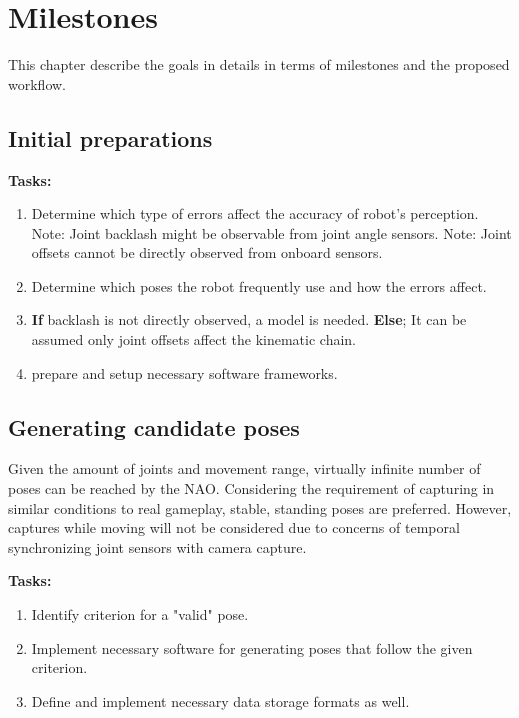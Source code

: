 \documentclass[english, printversion, nomenclature, notitle]{tuvisionthesis} %
\begin{document}
\chapter{Milestones}
\label{chap:milestones}

This chapter describe the goals in details in terms of milestones and the proposed workflow.

\section{Initial preparations}
\textbf{Tasks:}
\begin{enumerate}
	\item Determine which type of errors affect the accuracy of robot's perception.
	\subitem Note: Joint backlash might be observable from joint angle sensors.
	\subitem Note: Joint offsets cannot be directly observed from onboard sensors.
	\item Determine which poses the robot frequently use and how the errors affect.
	\item \textbf{If} backlash is not directly observed, a model is needed.
	\subitem \textbf{Else}; It can be assumed only joint offsets affect the kinematic chain.
	\item prepare and setup necessary software frameworks.
\end{enumerate}

\section{Generating candidate poses}
Given the amount of joints and movement range, virtually infinite number of poses can be reached by the NAO. Considering the requirement of capturing in similar conditions to real gameplay, stable, standing poses are preferred. However, captures while moving will not be considered due to concerns of temporal synchronizing joint sensors with camera capture.

\textbf{Tasks:}
\begin{enumerate}
	\item Identify criterion for a "valid" pose.
	\item Implement necessary software for generating poses that follow the given criterion.
	\item Define and implement necessary data storage formats as well.
\end{enumerate}
\end{document}
